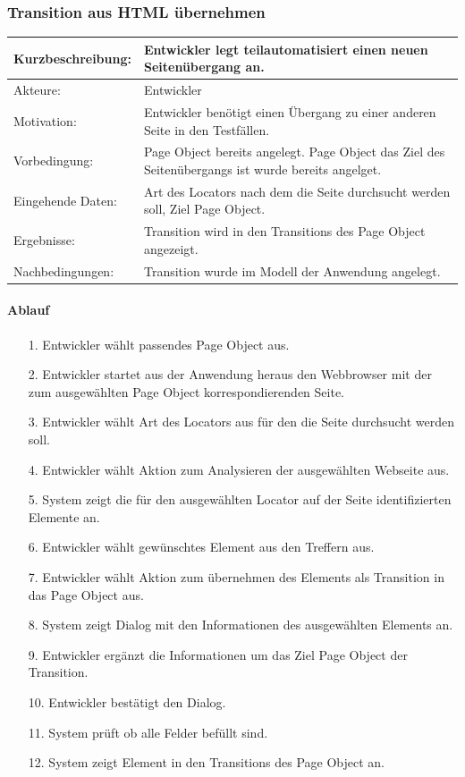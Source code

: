\subsubsection{Transition aus HTML übernehmen}
\label{sec:Transition_from_html}

\begin{tabular}[h]{|p{4cm}|p{}|}
\hline 
\rule[-1ex]{0pt}{2.5ex}Kurzbeschreibung: & 
Entwickler legt teilautomatisiert einen neuen Seitenübergang an. \\  
\hline 
\rule[-1ex]{0pt}{2.5ex}Akteure: & 
Entwickler \\ 
\hline 
\rule[-1ex]{0pt}{2.5ex}Motivation: & 
Entwickler benötigt einen Übergang zu einer anderen Seite in den Testfällen. \\ 
\hline 
\rule[-1ex]{0pt}{2.5ex}Vorbedingung: & 
Page Object bereits angelegt. Page Object das Ziel des Seitenübergangs ist wurde bereits angelget. \\ 
\hline 
\rule[-1ex]{0pt}{2.5ex}Eingehende Daten: & Art des Locators nach dem die Seite durchsucht werden soll, Ziel Page Object. \\ 
\hline 
\rule[-1ex]{0pt}{2.5ex}Ergebnisse: & Transition wird in den Transitions des Page Object angezeigt. \\ 
\hline 
\rule[-1ex]{0pt}{2.5ex}Nachbedingungen: & Transition wurde im Modell der Anwendung angelegt.  \\ 
\hline 
\end{tabular} 

\paragraph{Ablauf}

\begin{itemize}[itemsep=0pt]
\item[1.] Entwickler wählt passendes Page Object aus.
\item[2.] Entwickler startet aus der Anwendung heraus den Webbrowser mit der zum ausgewählten Page Object korrespondierenden Seite. 
\item[3.] Entwickler wählt Art des Locators aus für den die Seite durchsucht werden soll.
\item[4.] Entwickler wählt Aktion zum Analysieren der ausgewählten Webseite aus.
\item[5.] System zeigt die für den ausgewählten Locator auf der Seite identifizierten Elemente an.
\item[6.] Entwickler wählt gewünschtes Element aus den Treffern aus. 
\item[7.] Entwickler wählt Aktion zum übernehmen des Elements als Transition in das Page Object aus.
\item[8.] System zeigt Dialog mit den Informationen des ausgewählten Elements an.
\item[9.] Entwickler ergänzt die Informationen um das Ziel Page Object der Transition.
\item[10.] Entwickler bestätigt den Dialog.
\item[11.] System prüft ob alle Felder befüllt sind.
\item[12.] System zeigt Element in den Transitions des Page Object an.
\end{itemize}

